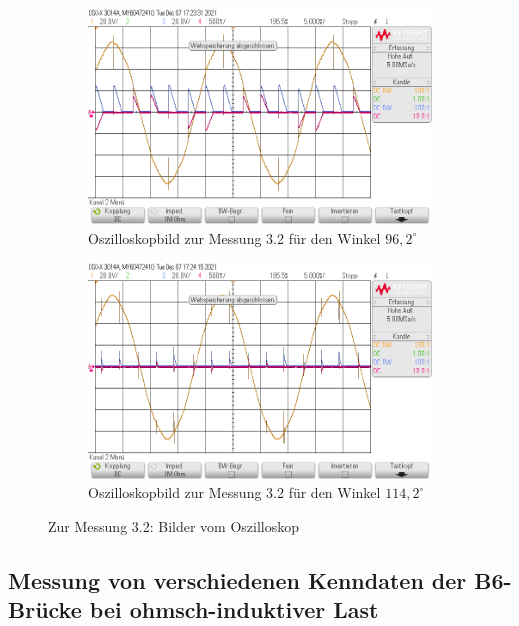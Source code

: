 \documentclass{article}
\begin{document}
\begin{figure}[h]
  \centering
  \begin{subfigure}{.45\textwidth}
    \centering
    \includegraphics[width=\linewidth]{../assets/images/GEP2/32_Winkel962.png}
    \caption{Oszilloskopbild zur Messung 3.2 für den Winkel $96,2^{\circ}$}
  \end{subfigure}
  \begin{subfigure}{.45\textwidth}
    \centering
    \includegraphics[width=\linewidth]{../assets/images/GEP2/32_Winkel1142.png}
    \caption{Oszilloskopbild zur Messung 3.2 für den Winkel $114,2^{\circ}$}
  \end{subfigure}
  \label{fig:31_242}
  \caption{Zur Messung 3.2: Bilder vom Oszilloskop}
\end{figure}

\newpage

\subsection{Messung von verschiedenen Kenndaten der B6-Brücke bei ohmsch-induktiver Last}
\end{document}
